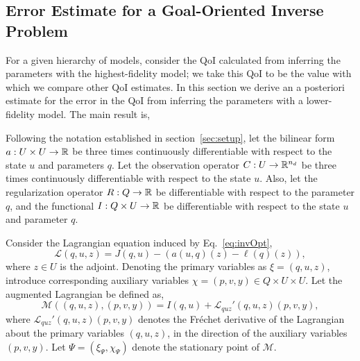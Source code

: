 \subsection[Error Estimate for a Goal-Oriented Inverse Problem]{Error Estimate for a Goal-Oriented Inverse Problem}  \label{sec:deriv}
%
For a given hierarchy of models, consider the QoI calculated from inferring the parameters with the highest-fidelity model; we take this QoI to be the value with which we compare other QoI estimates. In this section we derive an a posteriori estimate for the error in the QoI from inferring the parameters with a lower-fidelity model. The main result is,
%
\begin{theorem}
\label{thm:error_estimate}
Following the notation established in section~\ref{sec:setup}, let the bilinear form $a:U \times U \to {\mathbb{R}}$ be three times continuously differentiable with respect to the state $u$ and parameters $q$. Let the observation operator $C:U\to{\mathbb{R}}^{n_d}$ be three times continuously differentiable with respect to the state $u$. Also, let the regularization operator $R:Q\to{\mathbb{R}}$ be differentiable with respect to the parameter $q$, and the functional $I:Q\times U\to{\mathbb{R}}$ be differentiable with respect to the state $u$ and parameter $q$.

Consider the Lagrangian equation induced by Eq.~\eqref{eq:invOpt},
%
\begin{equation}
\label{eq:InvsOpt_lag}
\mathcal{L}(q,u,z)= J(q,u)-(a(u,q)(z)-\ell(q)(z)),
\end{equation}
%
where $z\in U$ is the adjoint. Denoting the primary variables as $\xi=(q,u,z)$, introduce corresponding auxiliary variables $\chi=(p,v,y)\in Q\times U\times U$. Let the augmented Lagrangian be defined as,
%
\begin{equation}
\label{eq:InvsOpt_auglag}
\mathcal{M}((q,u,z),(p,v,y)) = I(q,u) + \mathcal{L}_{quz}'(q,u,z)(p,v,y),
\end{equation}
%
where $\mathcal{L}_{quz}'(q,u,z)(p,v,y)$ denotes the Fr\'{e}chet derivative of the Lagrangian about the primary variables $(q,u,z)$, in the direction of the auxiliary variables $(p,v,y)$. Let $\Psi = (\xi_\Psi,\chi_\Psi)$ denote the stationary point of $\mathcal{M}$.


\end{theorem}
